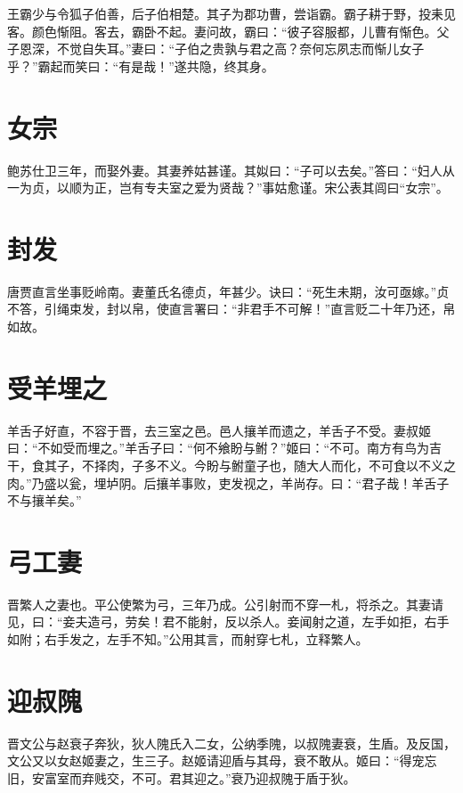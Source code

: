 \documentclass[a4paper,12pt,UTF8,twoside]{ctexbook}
\begin{document}
    王霸少与令狐子伯善，后子伯相楚。其子为郡功曹，尝诣霸。霸子耕于野，投耒见客。颜色惭阻。客去，霸卧不起。妻问故，霸曰：“彼子容服都，儿曹有惭色。父子恩深，不觉自失耳。”妻曰：“子伯之贵孰与君之高？奈何忘夙志而惭儿女子乎？”霸起而笑曰：“有是哉！”遂共隐，终其身。
    
    \section{女宗}
    
    鲍苏仕卫三年，而娶外妻。其妻养姑甚谨。其姒曰：“子可以去矣。”答曰：“妇人从一为贞，以顺为正，岂有专夫室之爱为贤哉？”事姑愈谨。宋公表其闾曰“女宗”。
    
    \section{封发}
    
    唐贾直言坐事贬岭南。妻董氏名德贞，年甚少。诀曰：“死生未期，汝可亟嫁。”贞不答，引绳束发，封以帛，使直言署曰：“非君手不可解！”直言贬二十年乃还，帛如故。
    
    \section{受羊埋之}
    
    羊舌子好直，不容于晋，去三室之邑。邑人攘羊而遗之，羊舌子不受。妻叔姬曰：“不如受而埋之。”羊舌子曰：“何不飨盼与鲋？”姬曰：“不可。南方有鸟为吉干，食其子，不择肉，子多不义。今盼与鲋童子也，随大人而化，不可食以不义之肉。”乃盛以瓮，埋垆阴。后攘羊事败，吏发视之，羊尚存。曰：“君子哉！羊舌子不与攘羊矣。”
    
    \section{弓工妻}
    
    晋繁人之妻也。平公使繁为弓，三年乃成。公引射而不穿一札，将杀之。其妻请见，曰：“妾夫造弓，劳矣！君不能射，反以杀人。妾闻射之道，左手如拒，右手如附；右手发之，左手不知。”公用其言，而射穿七札，立释繁人。
    
    \section{迎叔隗}
    
    晋文公与赵衰子奔狄，狄人隗氏入二女，公纳季隗，以叔隗妻衰，生盾。及反国，文公又以女赵姬妻之，生三子。赵姬请迎盾与其母，衰不敢从。姬曰：“得宠忘旧，安富室而弃贱交，不可。君其迎之。”衰乃迎叔隗于盾于狄。
    
\end{document}
